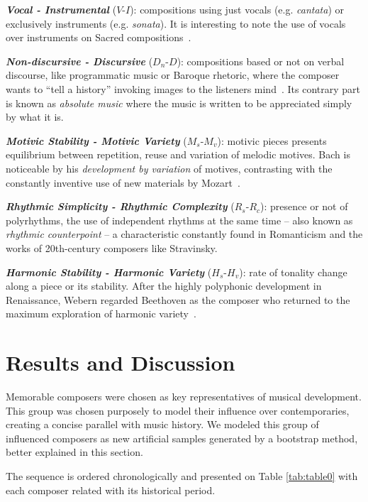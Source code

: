 \documentclass[
 aip,
 jmp,
 amsmath,amssymb,
 reprint,
]{revtex4-1}
\begin{document}
{\bf \em{ Vocal - Instrumental}} ($V$-$I$): compositions using just vocals
(e.g. \emph{cantata}) or exclusively instruments
(e.g. \emph{sonata}). It is interesting to note the use of
vocals over instruments on Sacred compositions~\cite{Lovelock}.

{\bf \em{ Non-discursive - Discursive}} ($D_n$-$D$): compositions
based or not
on verbal discourse, like programmatic music or Baroque rhetoric, where the composer wants
to ``tell a history'' invoking images to the listeners
mind~\cite{BennettHistory}. Its contrary part is known as
\textit{absolute music} where the music is written to be appreciated simply
by what it is.

{\bf \em{ Motivic Stability - Motivic Variety}} ($M_s$-$M_v$): motivic pieces presents equilibrium
between repetition, reuse and variation of melodic motives. Bach is noticeable by his
\textit{development by variation} of motives, contrasting with the
constantly inventive use of new materials by Mozart~\cite{Webern}.

{\bf \em{ Rhythmic Simplicity - Rhythmic Complexity}} ($R_s$-$R_c$): presence or not of polyrhythms, the
use of independent rhythms at the same time -- also known as
\textit{rhythmic counterpoint}\cite{BennettHistory} -- a characteristic
constantly found in Romanticism and the works of 20th-century composers like Stravinsky.

{\bf \em{ Harmonic Stability - Harmonic Variety}} ($H_s$-$H_v$):
rate of tonality change along a piece or its stability. After the highly
polyphonic development in Renaissance, Webern regarded Beethoven as the
composer who returned to the maximum exploration of harmonic variety~\cite{Webern}.

\section{Results and Discussion}
\label{sec:results}

Memorable composers were chosen as key representatives
of musical development. 
This group was chosen purposely to model their influence
over contemporaries, creating a concise parallel with music history. We modeled this group of influenced
composers as new artificial samples generated by a bootstrap method, better
explained in this section.

The sequence
is ordered chronologically and presented on Table \ref{tab:table0} with
each composer related with its historical period.
\end{document}

